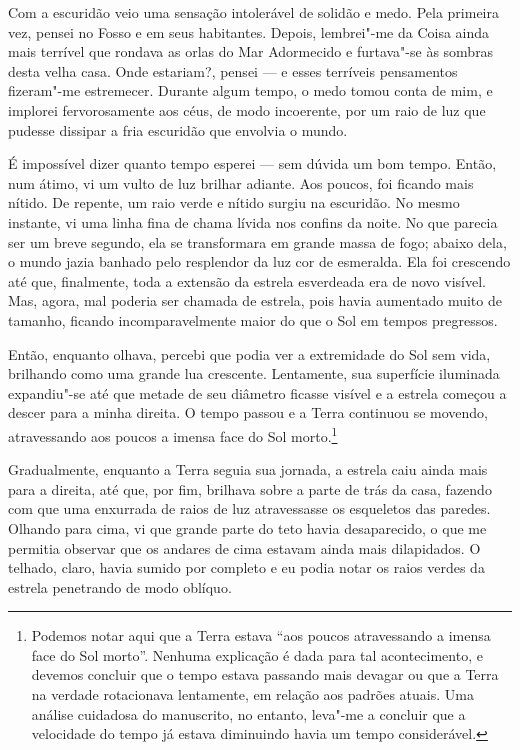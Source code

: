 Com a escuridão veio uma sensação intolerável de solidão e medo. Pela primeira vez, pensei no Fosso e em seus
habitantes. Depois, lembrei"-me da Coisa ainda mais terrível que rondava as orlas do Mar Adormecido e furtava"-se às
sombras desta velha casa. Onde estariam?, pensei --- e esses terríveis pensamentos fizeram"-me estremecer. Durante algum
tempo, o medo tomou conta de mim, e implorei fervorosamente aos céus, de modo incoerente, por um raio de luz que
pudesse dissipar a fria escuridão que envolvia o mundo.

É impossível dizer quanto tempo esperei --- sem dúvida um bom tempo. Então, num átimo, vi um vulto de luz brilhar
adiante. Aos poucos, foi ficando mais nítido. De repente, um raio verde e nítido surgiu na escuridão. No mesmo
instante, vi uma linha fina de chama lívida nos confins da noite. No que parecia ser um breve segundo, ela se
transformara em grande massa de fogo; abaixo dela, o mundo jazia banhado pelo resplendor da luz cor de esmeralda.
Ela foi crescendo até que, finalmente, toda a extensão da estrela esverdeada era de novo visível. Mas, agora, mal
poderia ser chamada de estrela, pois havia aumentado muito de tamanho, ficando incomparavelmente maior do que o
Sol em tempos pregressos.

Então, enquanto olhava, percebi que podia ver a extremidade do Sol sem vida, brilhando como uma grande lua crescente.
Lentamente, sua superfície iluminada expandiu"-se até que metade de seu diâmetro ficasse visível e a estrela começou a
descer para a minha direita. O tempo passou e a Terra continuou se movendo, atravessando aos poucos a imensa face do
Sol morto.\footnote{ Podemos notar aqui que a Terra estava “aos poucos atravessando a imensa face do Sol morto”. Nenhuma explicação é
dada para tal acontecimento, e devemos concluir que o tempo estava passando mais devagar ou que a Terra na verdade
rotacionava lentamente, em relação aos padrões atuais. Uma análise cuidadosa do manuscrito, no entanto, leva"-me a
concluir que a velocidade do tempo já estava diminuindo havia um tempo considerável.}

Gradualmente, enquanto a Terra seguia sua jornada, a estrela caiu ainda mais para a direita, até que, por fim,
brilhava sobre a parte de trás da casa, fazendo com que uma enxurrada de raios de luz atravessasse os esqueletos das
paredes. Olhando para cima, vi que grande parte do teto havia desaparecido, o que me permitia observar que os andares de
cima estavam ainda mais dilapidados. O telhado, claro, havia sumido por completo e eu podia notar os raios
verdes da estrela penetrando de modo oblíquo. 


